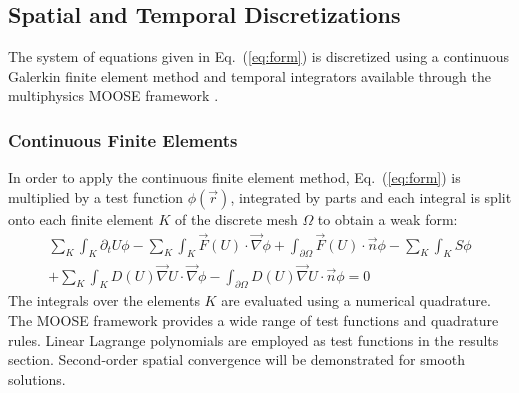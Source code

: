 \documentclass[preprint,10pt]{elsarticle}
\newcommand{\grad}{\vec{\nabla}}
\newcommand{\eqt}[1]{Eq.~(\ref{#1})}                     %
\begin{document}
\subsection{Spatial and Temporal Discretizations} \label{sec:disc}
The system of equations given in \eqt{eq:form} is discretized using a continuous Galerkin finite element method and temporal integrators available through the multiphysics MOOSE framework \cite{MOOSE}.
\subsubsection{Continuous Finite Elements} 
In order to apply the continuous finite element method, \eqt{eq:form} is multiplied by a test function $\phi(\vec{r})$, integrated by parts and each integral is split onto each finite element $K$ of the discrete mesh $\Omega$ to obtain a weak form:
\begin{multline}\label{eq:cfem}
\sum_K \int_{K} \partial_t U \phi - \sum_K \int_{K} \vec{F}(U) \cdot \grad \phi + \int_{\partial \Omega} \vec{F}(U) \cdot \vec{n} \phi - \sum_K \int_{K} S \phi  \\
+ \sum_K \int_{K} D(U) \grad U \cdot \grad \phi - \int_{\partial \Omega} D(U) \grad U \cdot \vec{n} \phi = 0
\end{multline}
The integrals over the elements $K$ are evaluated using a numerical quadrature. The MOOSE framework provides a wide range of test functions and quadrature rules. Linear Lagrange polynomials are employed as test functions in the results section. Second-order spatial convergence will be demonstrated for smooth solutions. 

\end{document}
